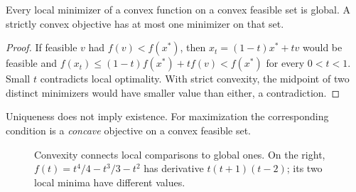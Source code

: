\documentclass[11pt,a4paper]{article}
\begin{document}
\begin{proposition}
  Every local minimizer of a convex function on a convex feasible set is global.
  A strictly convex objective has at most one minimizer on that set.
\end{proposition}
\begin{proof}
  If feasible $v$ had $f(v)<f(x^*)$, then
  $x_t=(1-t)x^*+tv$ would be feasible and
  $f(x_t)\leq(1-t)f(x^*)+tf(v)<f(x^*)$ for every $0<t<1$.
  Small $t$ contradicts local optimality.
  With strict convexity, the midpoint of two distinct minimizers would have
  smaller value than either, a contradiction.
\end{proof}
Uniqueness does not imply existence. For maximization the corresponding
condition is a \emph{concave} objective on a convex feasible set.

\begin{figure}[H]
  \centering
  \caption{Convexity connects local comparisons to global ones. On the right,
    $f(t)=t^4/4-t^3/3-t^2$ has derivative $t(t+1)(t-2)$;
    its two local minima have different values.}\label{fig:local-global}
\end{figure}
\end{document}
